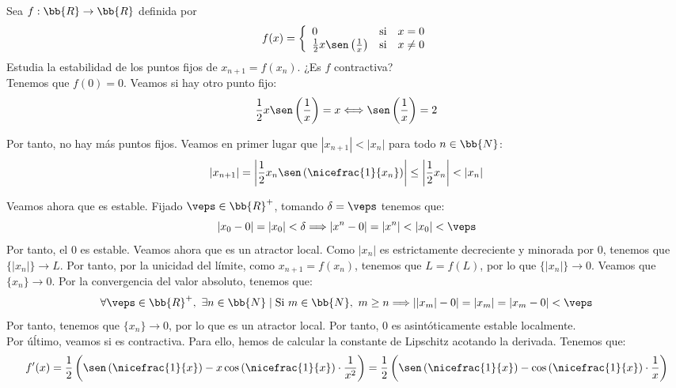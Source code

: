 \begin{ejercicio}
    Sea $f:\bb{R}\to \bb{R}$ definida por
    \begin{equation*}
        f(x)=\left\{\begin{array}{lll}
            0 & \text{si} & x=0\\
            \frac{1}{2}x\sen\left(\frac{1}{x}\right) & \text{si} & x\neq 0
        \end{array}\right.
    \end{equation*}
    Estudia la estabilidad de los puntos fijos de $x_{n+1} = f(x_n)$. ¿Es $f$ contractiva?\\

    Tenemos que $f(0)=0$. Veamos si hay otro punto fijo:
    \begin{equation*}
        \frac{1}{2}x\sen\left(\frac{1}{x}\right) = x
        \Longleftrightarrow
        \sen\left(\frac{1}{x}\right) = 2
    \end{equation*}

    Por tanto, no hay más puntos fijos. Veamos en primer lugar que $|x_{n+1}| < |x_n|$ para todo $n\in \bb{N}$:
    \begin{equation*}
        |x_{n+1}| = \left|\frac{1}{2}x_n\sen\left(\nicefrac{1}{x_n}\right)\right| \leq \left|\frac{1}{2}x_n\right|<|x_n|
    \end{equation*}

    Veamos ahora que es estable. Fijado $\veps\in \bb{R}^+$, tomando $\delta=\veps$ tenemos que:
    \begin{equation*}
        |x_0-0| = |x_0|<\delta \Longrightarrow
        |x^n-0| = |x^n| < |x_0| < \veps
    \end{equation*}
    Por tanto, el $0$ es estable. Veamos ahora que es un atractor local. Como $|x_n|$ es estrictamente decreciente y minorada por $0$, tenemos que $\{|x_n|\}\to L$. Por tanto, por la unicidad del límite, como $x_{n+1}=f(x_n)$, tenemos que $L=f(L)$, por lo que $\{|x_n|\}\to 0$. Veamos que $\{x_n\}\to 0$. Por la convergencia del valor absoluto, tenemos que:
    \begin{equation*}
        \forall \veps\in \bb{R}^+,~\exists n\in \bb{N}\mid \text{Si } m\in \bb{N},~m\geq n\Longrightarrow
        ||x_m|-0| = |x_m| = |x_m-0|<\veps
    \end{equation*}
    Por tanto, tenemos que $\{x_n\}\to 0$, por lo que es un atractor local. Por tanto, $0$ es asintóticamente estable localmente.\\

    Por úĺtimo, veamos si es contractiva. Para ello, hemos de calcular la constante de Lipschitz acotando la derivada. Tenemos que:
    \begin{equation*}
        f'(x)=\frac{1}{2}\left(\sen\left(\nicefrac{1}{x}\right)-x\cos\left(\nicefrac{1}{x}\right)\cdot \frac{1}{x^2}\right)
        =\frac{1}{2}\left(\sen\left(\nicefrac{1}{x}\right)-\cos\left(\nicefrac{1}{x}\right)\cdot \frac{1}{x}\right)
    \end{equation*}


\end{ejercicio}

